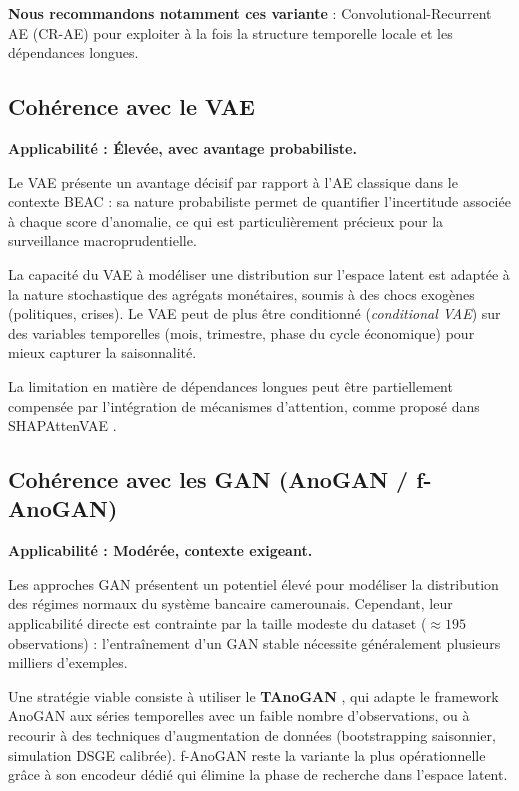 \documentclass[12pt, a4paper]{article}
\begin{document}
\textbf{Nous recommandons notamment ces variante} : Convolutional-Recurrent AE (CR-AE) pour
exploiter à la fois la structure temporelle locale et les dépendances
longues.

\subsection{Cohérence avec le VAE}

\textbf{Applicabilité : Élevée, avec avantage probabiliste.}

Le VAE présente un avantage décisif par rapport à l'AE classique dans
le contexte BEAC : sa nature probabiliste permet de quantifier
l'incertitude associée à chaque score d'anomalie, ce qui est
particulièrement précieux pour la surveillance macroprudentielle.

La capacité du VAE à modéliser une distribution sur l'espace latent
est adaptée à la nature stochastique des agrégats monétaires, soumis
à des chocs exogènes (politiques, crises). Le VAE peut de plus être
conditionné (\textit{conditional VAE}) sur des variables temporelles
(mois, trimestre, phase du cycle économique) pour mieux capturer la
saisonnalité.

La limitation en matière de dépendances longues peut être partiellement
compensée par l'intégration de mécanismes d'attention, comme proposé
dans SHAPAttenVAE \cite{shap2025}.

\subsection{Cohérence avec les GAN (AnoGAN / f-AnoGAN)}

\textbf{Applicabilité : Modérée, contexte exigeant.}

Les approches GAN présentent un potentiel élevé pour modéliser la
distribution des régimes normaux du système bancaire camerounais.
Cependant, leur applicabilité directe est contrainte par la taille
modeste du dataset ($\approx 195$ observations) : l'entraînement d'un
GAN stable nécessite généralement plusieurs milliers d'exemples.

Une stratégie viable consiste à utiliser le \textbf{TAnoGAN}
\cite{tanogan2020}, qui adapte le framework AnoGAN aux séries temporelles
avec un faible nombre d'observations, ou à recourir à des techniques
d'augmentation de données (bootstrapping saisonnier, simulation DSGE
calibrée). f-AnoGAN reste la variante la plus opérationnelle grâce à
son encodeur dédié qui élimine la phase de recherche dans l'espace latent.
\end{document}
